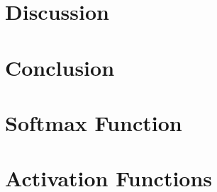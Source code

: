 \documentclass[twocolumn, twoside, 10pt]{article}
\begin{document}
\section{Discussion}


\section{Conclusion}


\clearpage

\onecolumn
\printbibliography[heading=bibnumbered, title=References]
\clearpage

\appendix
\section{Softmax Function}

\clearpage

\section{Activation Functions}

\clearpage

% 

% 
\end{document}
